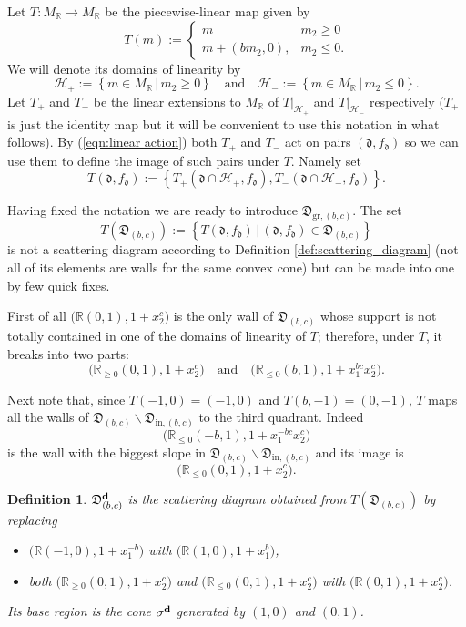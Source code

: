 \documentclass[11pt]{amsart}
\newtheorem{defn}[theorem]{Definition}
\theoremstyle{remark}
\numberwithin{equation}{section}
\newcommand{\RR}{\mathbb{R}}
\newcommand{\fd}{\mathfrak{d}}
\newcommand{\fD}{\mathfrak{D}}
\newcommand{\bfd}{{\bf d}}
\begin{document}
Let $T:M_\RR\rightarrow M_\RR$ be the piecewise-linear map given by
\[
  T (m) := 
  \begin{cases}
    m   & m_2 \geq 0 \\
    m + (bm_2,0), & m_2 \leq 0.
  \end{cases}
\]
We will denote its domains of linearity by 
\[ 
  \mathcal{H}_{+} := 
  \left\{ m \in M_{\mathbb{R}}\, |\, m_2 \geq 0 \right\} 
  \quad
  \mbox{and}
  \quad
  \mathcal{H}_{-} := 
  \left\{ m \in M_{\mathbb{R}} \,|\, m_2 \leq 0 \right\}.
\]
Let $T_+$ and $T_-$ be the linear extensions to $M_\RR$ of $T|_{\mathcal{H}_+}$
and $T|_{\mathcal{H}_-}$ respectively ($T_+$ is just the identity map but it
will be convenient to use this notation in what follows). 
By (\ref{eqn:linear action}) both $T_+$ and $T_-$ act on pairs $(\fd,f_\fd)$ so
we can use them to define the image of such pairs under $T$. Namely set
\[
  T(\fd,f_\fd):=
  \left\{
    T_+\left(\fd\cap\mathcal{H}_+,f_\fd\right),
    T_-\left(\fd\cap\mathcal{H}_-,f_\fd\right)
  \right\}.
\]

Having fixed the notation we are ready to introduce $\fD_{\mathrm{gr},(b,c)}$.
The set
\[
  T(\fD_{(b,c)}):=
  \left\{
    T(\fd,f_\fd)\, |\, (\fd,f_\fd)\in \fD_{(b,c)}
  \right\}
\]
is not a scattering diagram according to Definition 
\ref{def:scattering_diagram} (not all of its elements are walls for the same
convex cone) but can be made into one by few quick fixes.

First of all $\big( \RR (0,1), 1+x_2^c\big)$ is the only wall of $\fD_{(b,c)}$
whose support is not totally contained in one of the domains of linearity of
$T$; therefore, under $T$, it breaks into two parts:
\[
  \big( \RR_{\ge0} (0,1), 1+x_2^c\big)
  \quad
  \mbox{and}
  \quad
  \big( \RR_{\le 0} (b,1), 1+x_1^{bc}x_2^c\big).
\]

Next note that, since $T(-1,0)=(-1,0)$ and $T(b,-1)=(0,-1)$, $T$ maps all the
walls of $\fD_{(b,c)}\smallsetminus\fD_{\mathrm{in},(b,c)}$ to the third quadrant. 
Indeed 
\[
  \big(\RR_{\leq0}(-b,1),1+x_1^{-bc}x_2^c\big)
\]
is the wall with the biggest slope in
$\fD_{(b,c)}\smallsetminus\fD_{\mathrm{in},(b,c)}$ and its image is 
\[
  \big( \RR_{\le0} (0,1), 1+x_2^c\big).
\]

\begin{defn}
  $\fD_{(b,c)}^\bfd$ is the scattering diagram obtained from
  $T\left(\fD_{(b,c)}\right)$ by replacing 
  \begin{itemize}
    \item
      $\big(\RR (-1,0), 1+x_1^{-b}\big)$ with $\big(\RR  (1,0), 1+x_1^b\big)$,
    \item 
      both $ \big( \RR_{\ge0} (0,1), 1+x_2^c\big)$ and $\big( \RR_{\le0} (0,1),
      1+x_2^c\big)$ with $ \big( \RR (0,1), 1+x_2^c\big)$.
  \end{itemize}
  Its base region is the cone $\sigma^\bfd$ generated by $(1,0)$ and $(0,1)$.
\end{defn}
\end{document}
